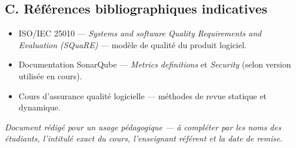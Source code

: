 \documentclass[11pt,a4paper]{article}
\begin{document}
\subsection*{C. Références bibliographiques indicatives}

\begin{itemize}[noitemsep]
  \item ISO/IEC 25010 --- \textit{Systems and software Quality Requirements and Evaluation (SQuaRE)} --- modèle de qualité du produit logiciel.
  \item Documentation SonarQube --- \textit{Metrics definitions} et \textit{Security} (selon version utilisée en cours).
  \item Cours d'assurance qualité logicielle --- méthodes de revue statique et dynamique.
\end{itemize}

\vspace{1.5em}
\noindent\textit{Document rédigé pour un usage pédagogique --- à compléter par les noms des étudiants, l'intitulé exact du cours, l'enseignant référent et la date de remise.}
\end{document}
